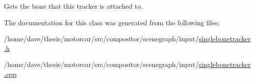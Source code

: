 Gets the bone that this tracker is attached to. 



The documentation for this class was generated from the following files\-:\begin{DoxyCompactItemize}
\item 
/home/dave/thesis/motorcar/src/compositor/scenegraph/input/\hyperlink{singlebonetracker_8h}{singlebonetracker.\-h}\item 
/home/dave/thesis/motorcar/src/compositor/scenegraph/input/\hyperlink{singlebonetracker_8cpp}{singlebonetracker.\-cpp}\end{DoxyCompactItemize}
